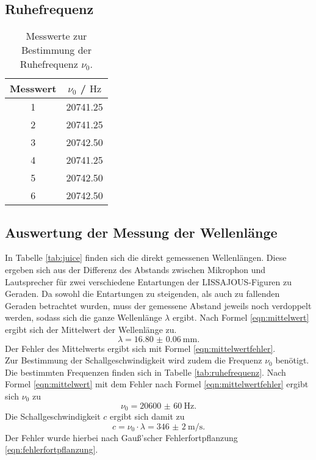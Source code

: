 \FloatBarrier
\subsection{Ruhefrequenz}
\begin{table}
	\centering
	\caption{Messwerte zur Bestimmung der Ruhefrequenz $\nu_0$.}
	\label{tab:ruhefr}
	\begin{tabular}{cc}
		\toprule
		Messwert & $\nu_0$ / $\si{\hertz}$ \\
		\midrule
		1        & 20741.25                \\
		2        & 20741.25                \\
		3        & 20742.50                \\
		4        & 20741.25                \\
		5        & 20742.50                \\
		6        & 20742.50                \\
		\bottomrule
	\end{tabular}
\end{table}
\FloatBarrier
\subsection{Auswertung der Messung der Wellenlänge}
In Tabelle \ref{tab:juice} finden sich die direkt gemessenen Wellenlängen. Diese ergeben sich aus der Differenz des Abstands zwischen Mikrophon und Lautsprecher für zwei verschiedene Entartungen der LISSAJOUS-Figuren zu Geraden.
Da sowohl die Entartungen zu steigenden, als auch zu fallenden Geraden betrachtet wurden, muss der gemessene Abstand jeweils noch verdoppelt werden, sodass sich die ganze Wellenlänge $\lambda$ ergibt.
Nach Formel \eqref{eqn:mittelwert} ergibt sich der Mittelwert der Wellenlänge zu.
\begin{equation}
	\label{eqn:wellenlänge}
	\lambda=\SI{16.80(6)}{\milli\metre}\text{.}
\end{equation}
Der Fehler des Mittelwerts ergibt sich mit Formel \eqref{eqn:mittelwertfehler}.\\
Zur Bestimmung der Schallgeschwindigkeit wird zudem die Frequenz $\nu_{0}$ benötigt.
Die bestimmten Frequenzen finden sich in Tabelle \ref{tab:ruhefrequenz}.
Nach Formel \eqref{eqn:mittelwert} mit dem Fehler nach Formel \eqref{eqn:mittelwertfehler} ergibt sich $\nu_0$ zu
\begin{equation}
	\label{eqn:rrrruhe}
	\nu_0=\SI{20600(60)}{\Hz}\text{.}
\end{equation}
Die Schallgeschwindigkeit $c$ ergibt sich damit zu
\begin{equation}
	\label{eqn:Schallgeschwindigkeit}
	c=\nu_0 \cdot\lambda=\SI{346(2)}{\meter\per\second}\text{.}
\end{equation}
Der Fehler wurde hierbei nach Gauß'scher Fehlerfortpflanzung \eqref{eqn:fehlerfortpflanzung}.

